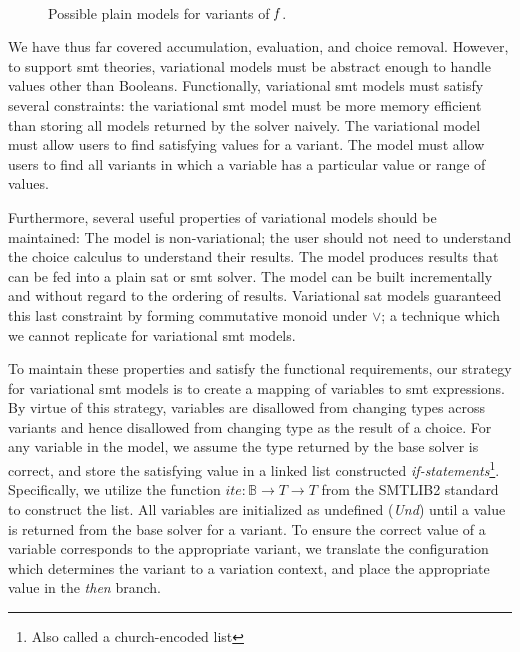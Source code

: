 ~\label{section:vsmt:models}
\begin{figure}[h]
    \centering
    \caption{Possible plain models for variants of $\mathit{f}$.}%
    \label{fig:vsmt:models:plain}
\end{figure}
We have thus far covered accumulation, evaluation, and choice removal. However,
to support \ac{smt} theories, variational models must be abstract enough to
handle values other than Booleans. Functionally, variational \ac{smt} models
must satisfy several constraints: the variational \ac{smt} model must be more
memory efficient than storing all models returned by the solver naively. The
variational model must allow users to find satisfying values for a variant. The
model must allow users to find all variants in which a variable has a particular
value or range of values.

Furthermore, several useful properties of variational models should be
maintained: The model is non-variational; the user should not need to understand
the choice calculus to understand their results. The model produces results that
can be fed into a plain \ac{sat} or \ac{smt} solver. The model can be built
incrementally and without regard to the ordering of results. Variational
\ac{sat} models guaranteed this last constraint by forming commutative monoid
under $\vee$; a technique which we cannot replicate for variational \ac{smt}
models.

To maintain these properties and satisfy the functional requirements, our
strategy for variational \ac{smt} models is to create a mapping of variables to
\ac{smt} expressions. By virtue of this strategy, variables are disallowed from
changing types across variants and hence disallowed from changing type as the
result of a choice. For any variable in the model, we assume the type returned
by the base solver is correct, and store the satisfying value in a linked list
constructed \emph{if-statements}\footnote{Also called a church-encoded list}.
Specifically, we utilize the function $ite : \mathbb{B} \rightarrow T
\rightarrow T$ from the SMTLIB2 standard to construct the list. All variables
are initialized as undefined (\emph{Und}) until a value is returned from the
base solver for a variant. To ensure the correct value of a variable corresponds
to the appropriate variant, we translate the configuration which determines the
variant to a variation context, and place the appropriate value in the
\emph{then} branch.

